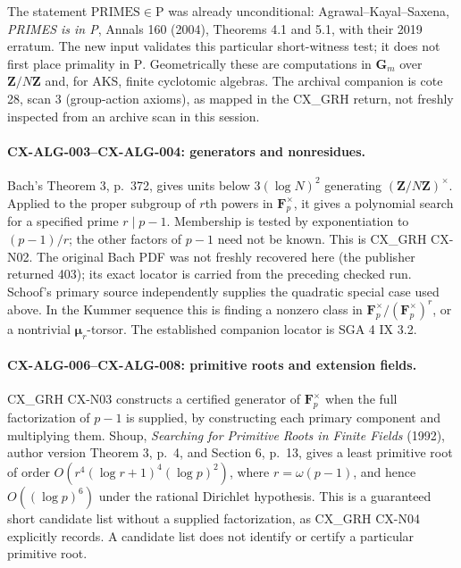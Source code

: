 \documentclass[11pt,a4paper]{article}
\begin{document}
The statement $\mathrm{PRIMES}\in\mathrm P$ was already unconditional:
Agrawal--Kayal--Saxena, \emph{PRIMES is in P}, Annals 160 (2004), Theorems 4.1
and 5.1, with their 2019 erratum. The new input validates this particular
short-witness test; it does not first place primality in $\mathrm P$.
Geometrically these are computations in $\mathbf G_m$ over $\mathbf Z/N\mathbf Z$
and, for AKS, finite cyclotomic algebras. The archival companion is cote 28,
scan 3 (group-action axioms), as mapped in the CX\_GRH return, not freshly
inspected from an archive scan in this session.

\paragraph{CX-ALG-003--CX-ALG-004: generators and nonresidues.}
Bach's Theorem 3, p.~372, gives units below $3(\log N)^2$ generating
$(\mathbf Z/N\mathbf Z)^\times$. Applied to the proper subgroup of $r$th
powers in $\mathbf F_p^\times$, it gives a polynomial search for a specified
prime $r\mid p-1$. Membership is tested by exponentiation to $(p-1)/r$;
the other factors of $p-1$ need not be known. This is CX\_GRH CX-N02.
The original Bach PDF was not freshly recovered here (the publisher returned
403); its exact locator is carried from the preceding checked run. Schoof's
primary source independently supplies the quadratic special case used above.
In the Kummer sequence this is finding a nonzero class in
$\mathbf F_p^\times/(\mathbf F_p^\times)^r$, or a nontrivial
$\boldsymbol\mu_r$-torsor. The established companion locator is SGA 4 IX 3.2.

\paragraph{CX-ALG-006--CX-ALG-008: primitive roots and extension fields.}
CX\_GRH CX-N03 constructs a certified generator of $\mathbf F_p^\times$ when
the full factorization of $p-1$ is supplied, by constructing each primary
component and multiplying them. Shoup, \emph{Searching for Primitive Roots
in Finite Fields} (1992), author version Theorem 3, p.~4, and Section 6,
p.~13, gives a least primitive root of order
$O(r^4(\log r+1)^4(\log p)^2)$, where $r=\omega(p-1)$,
and hence $O((\log p)^6)$ under the
rational Dirichlet hypothesis. This is a guaranteed short candidate list
without a supplied factorization, as CX\_GRH CX-N04 explicitly records.
A candidate list does not identify or certify a particular primitive root.
\end{document}
